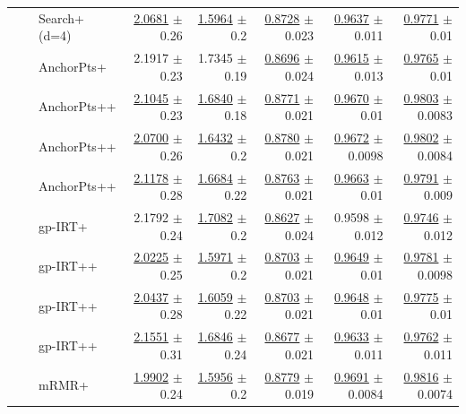 \begin{longtable}{llp{}rrrrr}
 &  & Search+ (d=4) & \underline{2.0681} {\scriptsize $\pm$ 0.26} & \underline{1.5964} {\scriptsize $\pm$ 0.2} & \underline{0.8728} {\scriptsize $\pm$ 0.023} & \underline{0.9637} {\scriptsize $\pm$ 0.011} & \underline{0.9771} {\scriptsize $\pm$ 0.01} \\
 &  & AnchorPts+ & 2.1917 {\scriptsize $\pm$ 0.23} & 1.7345 {\scriptsize $\pm$ 0.19} & \underline{0.8696} {\scriptsize $\pm$ 0.024} & \underline{0.9615} {\scriptsize $\pm$ 0.013} & \underline{0.9765} {\scriptsize $\pm$ 0.01} \\
 &  & AnchorPts++ & \underline{2.1045} {\scriptsize $\pm$ 0.23} & \underline{1.6840} {\scriptsize $\pm$ 0.18} & \underline{0.8771} {\scriptsize $\pm$ 0.021} & \underline{0.9670} {\scriptsize $\pm$ 0.01} & \underline{0.9803} {\scriptsize $\pm$ 0.0083} \\
 &  & AnchorPts++ & \underline{2.0700} {\scriptsize $\pm$ 0.26} & \underline{1.6432} {\scriptsize $\pm$ 0.2} & \underline{0.8780} {\scriptsize $\pm$ 0.021} & \underline{0.9672} {\scriptsize $\pm$ 0.0098} & \underline{0.9802} {\scriptsize $\pm$ 0.0084} \\
 &  & AnchorPts++ & \underline{2.1178} {\scriptsize $\pm$ 0.28} & \underline{1.6684} {\scriptsize $\pm$ 0.22} & \underline{0.8763} {\scriptsize $\pm$ 0.021} & \underline{0.9663} {\scriptsize $\pm$ 0.01} & \underline{0.9791} {\scriptsize $\pm$ 0.009} \\
 &  & gp-IRT+ & 2.1792 {\scriptsize $\pm$ 0.24} & \underline{1.7082} {\scriptsize $\pm$ 0.2} & \underline{0.8627} {\scriptsize $\pm$ 0.024} & 0.9598 {\scriptsize $\pm$ 0.012} & \underline{0.9746} {\scriptsize $\pm$ 0.012} \\
 &  & gp-IRT++ & \underline{2.0225} {\scriptsize $\pm$ 0.25} & \underline{1.5971} {\scriptsize $\pm$ 0.2} & \underline{0.8703} {\scriptsize $\pm$ 0.021} & \underline{0.9649} {\scriptsize $\pm$ 0.01} & \underline{0.9781} {\scriptsize $\pm$ 0.0098} \\
 &  & gp-IRT++ & \underline{2.0437} {\scriptsize $\pm$ 0.28} & \underline{1.6059} {\scriptsize $\pm$ 0.22} & \underline{0.8703} {\scriptsize $\pm$ 0.021} & \underline{0.9648} {\scriptsize $\pm$ 0.01} & \underline{0.9775} {\scriptsize $\pm$ 0.01} \\
 &  & gp-IRT++ & \underline{2.1551} {\scriptsize $\pm$ 0.31} & \underline{1.6846} {\scriptsize $\pm$ 0.24} & \underline{0.8677} {\scriptsize $\pm$ 0.021} & \underline{0.9633} {\scriptsize $\pm$ 0.011} & \underline{0.9762} {\scriptsize $\pm$ 0.011} \\
 &  & mRMR+ & \underline{1.9902} {\scriptsize $\pm$ 0.24} & \underline{1.5956} {\scriptsize $\pm$ 0.2} & \underline{0.8779} {\scriptsize $\pm$ 0.019} & \underline{0.9691} {\scriptsize $\pm$ 0.0084} & \underline{0.9816} {\scriptsize $\pm$ 0.0074} \\

\end{longtable}
